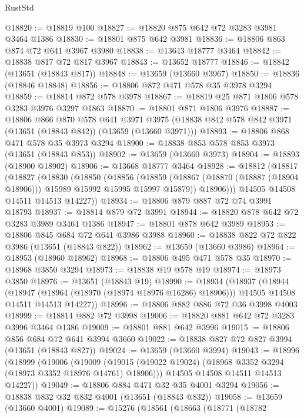 \begin{lexlean}{RustStd}
\begin{coremodule}
@18820 := @18819 @100
@18827 := @18820 @875 @642 @72 @3283 @3981 @3464 @1386
@18830 := @18801 @875 @642 @3981
@18836 := @18806 @863 @874 @72 @641 @3967 @3980
@18838 := @13643 @18777 @3464
@18842 := @18838 @817 @72 @817 @3967
@18843 := @13652 @18777
@18846 := @18842 (@13651 (@18843 @817))
@18848 := @13659 (@13660 @3967)
@18850 := @18836 (@18846 @18848)
@18856 := @18806 @872 @471 @578 @35 @3978 @3294
@18859 := @18814 @872 @578 @3978
@18867 := @18819 @25 @871 @1806 @578 @3283 @3976 @3297 @1863
@18870 := @18801 @871 @1806 @3976
@18887 := @18806
    @866
    @870
    @578
    @641
    @3971
    @3975
    (@18838 @842 @578 @842 @3971 (@13651 (@18843 @842)) (@13659 (@13660 @3971)))
@18893 := @18806 @868 @471 @578 @35 @3973 @3294
@18900 := @18838 @853 @578 @853 @3973 (@13651 (@18843 @853))
@18902 := @13659 (@13660 @3973)
@18904 := @18893 (@18900 @18902)
@18906 := @13668 @18777 @3464
@18928 := @18812
    (@18817
      (@18827
        (@18830
          (@18850
            (@18856
              (@18859 (@18867 (@18870 (@18887 (@18904 @18906))) @15989 @15992 @15995 @15997 @15879))
              @18906)))
        @14505
        @14508
        @14511
        @14513
        @14227))
@18934 := @18806 @879 @887 @72 @74 @3991 @18793
@18937 := @18814 @879 @72 @3991
@18944 := @18820 @878 @642 @72 @3283 @3989 @3464 @1386
@18947 := @18801 @878 @642 @3989
@18953 := @18806 @845 @684 @72 @641 @3986 @3988
@18960 := @18838 @822 @72 @822 @3986 (@13651 (@18843 @822))
@18962 := @13659 (@13660 @3986)
@18964 := @18953 (@18960 @18962)
@18968 := @18806 @495 @471 @578 @35
@18970 := @18968 @3850 @3294
@18973 := @18838 @19 @578 @19
@18974 := @18973 @3850
@18976 := @13651 (@18843 @19)
@18990 := @18934
    (@18937
      (@18944
        (@18947 (@18964 (@18970 (@18974 @18976 @16286) @18906)))
        @14505
        @14508
        @14511
        @14513
        @14227))
@18996 := @18806 @882 @886 @72 @36 @3998 @4003
@18999 := @18814 @882 @72 @3998
@19006 := @18820 @881 @642 @72 @3283 @3996 @3464 @1386
@19009 := @18801 @881 @642 @3996
@19015 := @18806 @856 @684 @72 @641 @3994 @3660
@19022 := @18838 @827 @72 @827 @3994 (@13651 (@18843 @827))
@19024 := @13659 (@13660 @3994)
@19043 := @18996
    (@18999
      (@19006
        (@19009 (@19015 (@19022 @19024) (@18968 @3352 @3294 (@18973 @3352 @18976 @14761) @18906)))
        @14505
        @14508
        @14511
        @14513
        @14227))
@19049 := @18806 @884 @471 @32 @35 @4001 @3294
@19056 := @18838 @832 @32 @832 @4001 (@13651 (@18843 @832))
@19058 := @13659 (@13660 @4001)
@19089 := @15276
    (@18561
      (@18663
        (@18771
          (@18782

\end{coremodule}
\end{lexlean}
